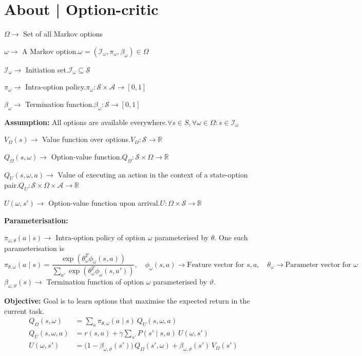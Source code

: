 \section*{About | Option-critic}

\( \Omega \to \) Set of all Markov options

\( \omega \to \) A Markov option.\@ \( \omega = (\mathcal{I}_\omega, \pi_\omega, \beta_\omega) \in \Omega \)

\( \mathcal{I}_\omega \to \) Initiation set.\@ \( \mathcal{I}_\omega \subseteq \mathcal{S} \)

\( \pi_\omega \to \) Intra-option policy.\@ \( \pi_\omega: \mathcal{S} \times \mathcal{A} \to [0, 1] \)

\( \beta_\omega \to \) Termination function.\@ \( \beta_\omega: \mathcal{S} \to [0, 1] \)

\textbf{Assumption:} All options are available everywhere.\@ \( \forall s \in S, \forall \omega \in \Omega: s \in \mathcal{I}_\omega \)

\( V_\Omega(s) \to \) Value function over options.\@ \( V_\Omega: \mathcal{S} \to \mathbb{R} \)

\( Q_\Omega(s, \omega) \to \) Option-value function.\@ \( Q_\Omega: \mathcal{S} \times \Omega \to \mathbb{R} \)

\( Q_U(s, \omega, a) \to \) Value of executing an action in the context of a state-option pair.\@ \( Q_U: \mathcal{S} \times \Omega \times \mathcal{A} \to \mathbb{R} \)

\( U(\omega, s') \to \) Option-value function upon arrival.\@ \( U: \Omega \times \mathcal{S} \to \mathbb{R} \)

\textbf{Parameterisation:}

\( \pi_{\omega, \theta}(a \mid s) \to \) Intra-option policy of option \( \omega \) parameterised by \( \theta \).
One such parameterisation is
\begin{equation}
    \pi_{\theta, \omega}(a \mid s)
    =
    \frac{\exp(\theta_\omega^T \phi_\omega(s, a))}{\sum_{a'} \exp(\theta_\omega^T \phi_\omega(s, a'))}
    , \quad
    \phi_\omega(s, a)
    \to
    \text{Feature vector for } s, a
    , \quad
    \theta_\omega
    \to
    \text{Parameter vector for } \omega
\end{equation}
\( \beta_{\omega, \vartheta}(s) \to \) Termination function of option \( \omega \) parameterised by \( \vartheta \).

\textbf{Objective:} Goal is to learn options that maximise the expected return in the current task.
\begin{align}
    Q_\Omega(s, \omega)
     & =
    \sum_{a} \pi_{\theta, \omega}(a \mid s) \ Q_U(s, \omega, a)
    \\
    Q_U(s, \omega, a)
     & =
    r(s, a) + \gamma \sum_{s'} P(s' \mid s, a) \ U(\omega, s')
    \\
    U(\omega, s')
     & =
    \big( 1 - \beta_{\omega, \vartheta}(s') \big) \, Q_\Omega(s', \omega) + \beta_{\omega, \vartheta}(s') \, V_\Omega(s')
\end{align}

